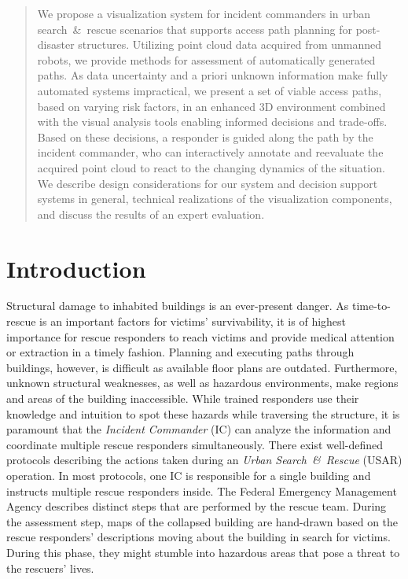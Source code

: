 \documentclass{egpubl}
\begin{document}
\begin{abstract}
We propose a visualization system for incident commanders in urban search~\&~rescue scenarios that supports access path planning for post-disaster structures. Utilizing point cloud data acquired from unmanned robots, we provide methods for assessment of automatically generated paths. As data uncertainty and a priori unknown information make fully automated systems impractical, we present a set of viable access paths, based on varying risk factors, in an enhanced 3D environment combined with the visual analysis tools enabling informed decisions and trade-offs. Based on these decisions, a responder is guided along the path by the incident commander, who can interactively annotate and reevaluate the acquired point cloud to react to the changing dynamics of the situation. We describe design considerations for our system and decision support systems in general, technical realizations of the visualization components, and discuss the results of an expert evaluation.

\begin{classification}
\end{classification}

\end{abstract}

\section{Introduction}
Structural damage to inhabited buildings is an ever-present danger. As time-to-rescue is an important factors for victims' survivability, it is of highest importance for rescue responders to reach victims and provide medical attention or extraction in a timely fashion. Planning and executing paths through buildings, however, is difficult as available floor plans are outdated. Furthermore, unknown structural weaknesses, as well as hazardous environments, make regions and areas of the building inaccessible. While trained responders use their knowledge and intuition to spot these hazards while traversing the structure, it is paramount that the \emph{Incident Commander} (IC) can analyze the information and coordinate multiple rescue responders simultaneously. There exist well-defined protocols describing the actions taken during an \emph{Urban Search~\&~Rescue} (USAR) operation. In most protocols, one IC is responsible for a single building and instructs multiple rescue responders inside. The Federal Emergency Management Agency describes distinct steps that are performed by the rescue team. During the assessment step, maps of the collapsed building are hand-drawn based on the rescue responders' descriptions moving about the building in search for victims. During this phase, they might stumble into hazardous areas that pose a threat to the rescuers' lives.
\end{document}
